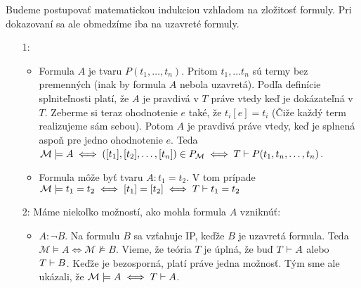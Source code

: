 \begin{dokaz}
    Budeme postupovať matematickou indukciou vzhľadom na zložitosť
    formuly. Pri dokazovaní sa ale obmedzíme iba na uzavreté formuly.
    \begin{itemize}
    \item[1:]
        \begin{itemize}
        \item Formula $A$ je tvaru $P(t_1,\dots,t_n)$. Pritom $t_1,
            \dots t_n$ sú termy bez premenných (inak by formula $A$
            nebola uzavretá). Podľa definície splniteľnosti platí, že
            $A$ je pravdivá v $T$ práve vtedy keď je dokázateľná v
            $T$. Zeberme si teraz ohodnotenie $e$ také, že
            $t_i[e] = t_i$ (Čiže každý term realizujeme sám sebou).
            Potom $A$ je pravdivá práve vtedy, keď je splnená aspoň
            pre jedno ohodnotenie $e$.
            Teda
            $\mathcal{M} \models A \iff
                ([t_1],[t_2],\dots,[t_n]) \in P_\mathcal{M} \iff
                T \vdash P(t_1,t_n, \dots, t_n)$.

        \item Formula môže byť tvaru $A:t_1=t_2$. V tom prípade
            $\mathcal{M} \models t_1 = t_2 \iff [t_1]=[t_2] \iff
                T \vdash t_1=t_2$
        \end{itemize}

    \item[2:]   Máme niekoľko možností, ako mohla formula $A$ vzniknúť:
        \begin{itemize}
        \item $A:\neg B$. Na formulu $B$ sa vzťahuje IP, keďže $B$ je
            uzavretá formula. Teda
            $\mathcal{M} \models A \iff \mathcal{M} \not \models B$.
            Vieme, že teória $T$ je úplná, že buď $T \vdash A$
            alebo $T \vdash B$. Keďže je bezosporná, platí práve
            jedna možnosť. Tým sme ale ukázali, že
            $\mathcal{M} \models A \iff T \vdash A$.


\end{itemize}
\end{itemize}
\end{dokaz}
